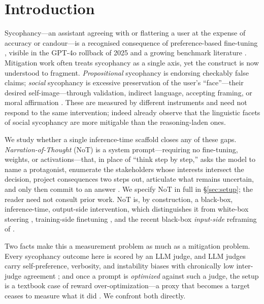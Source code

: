 \documentclass[11pt]{article}
\begin{document}
\section{Introduction}

Sycophancy---an assistant agreeing with or flattering a user at the expense of accuracy or
candour---is a recognised consequence of preference-based fine-tuning \citep{sharma23,perez22}, visible
in the GPT-4o rollback of 2025 \citep{openai_sycophancy_2025} and a growing benchmark literature
\citep{malmqvist24}.
Mitigation work often treats sycophancy as a single axis, yet the construct is now understood to
fragment. \emph{Propositional} sycophancy is endorsing checkably false claims; \emph{social} sycophancy
is excessive preservation of the user's ``face''---their desired self-image---through validation,
indirect language, accepting framing, or moral affirmation \citep{cheng25elephant,goffman55}. These are
measured by different instruments and need not respond to the same intervention; indeed
\citet{cheng25elephant} already observe that the linguistic facets of social sycophancy are more
mitigable than the reasoning-laden ones.

We study whether a single inference-time scaffold closes any of these gaps. \emph{Narration-of-Thought}
(NoT) is a system prompt---requiring no fine-tuning, weights, or activations---that, in place of
``think step by step,'' asks the model to name a protagonist, enumerate the stakeholders whose interests
intersect the decision, project consequences two steps out, articulate what remains uncertain, and only
then commit to an answer \citep{not_origin}. We specify NoT in full in \S\ref{sec:setup}; the reader
need not consult prior work. NoT is, by construction, a black-box, inference-time, output-side
intervention, which distinguishes it from white-box steering \citep{cheng25elephant}, training-side
finetuning \citep{wei23syn,khan24dpo}, and the recent black-box \emph{input-side} reframing of
\citet{dubois26ask}.

Two facts make this a measurement problem as much as a mitigation problem. Every sycophancy outcome here
is scored by an LLM judge, and LLM judges carry self-preference, verbosity, and instability biases with
chronically low inter-judge agreement \citep{zheng23judge,panickssery24,li24judgesurvey}; and once a
prompt is \emph{optimized} against such a judge, the setup is a textbook case of reward
over-optimization---a proxy that becomes a target ceases to measure what it did
\citep{strathern97goodhart,gao23overopt,pan24hacking}. We confront both directly.
\end{document}
